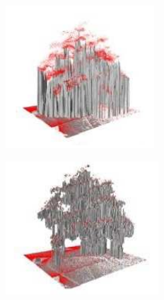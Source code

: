 \documentclass[11pt,openany]{book}
\begin{document}
\begin{figure}[H]
\begin{subfigure}[H]{0.4\linewidth}
        \includegraphics[width=\linewidth]{assets/2_5_b.png}
        \caption{{}}
        \label{fig:2.5b}
    \end{subfigure}
    \hfill
    \begin{subfigure}[H]{0.4\linewidth}
        \centering
        \includegraphics[width=\linewidth]{assets/2_5_c.png}
        \caption{{}}
        \label{fig:2.5c}

\end{subfigure}
\end{figure}
\end{document}
